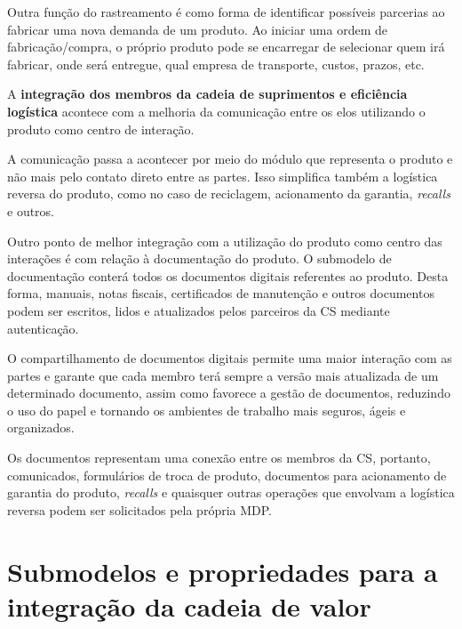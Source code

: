 Outra função do rastreamento é como forma de identificar possíveis parcerias ao fabricar uma nova demanda de um produto. Ao iniciar uma ordem de fabricação/compra, o próprio produto pode se encarregar de selecionar quem irá fabricar, onde será entregue, qual empresa de transporte, custos, prazos, etc.

A  \textbf{integração dos membros da cadeia de suprimentos e eficiência logística} acontece com a melhoria da comunicação entre os elos utilizando o produto como centro de interação.

A comunicação passa a acontecer por meio do módulo que representa o produto e não mais pelo contato direto entre as partes. Isso simplifica também a logística reversa do produto, como no caso de reciclagem, acionamento da garantia, \textit{recalls} e outros.

Outro ponto de melhor integração com a utilização do produto como centro das interações é com relação à documentação do produto. O submodelo de documentação conterá todos os documentos digitais referentes ao produto. Desta forma, manuais, notas fiscais, certificados de manutenção e outros documentos podem ser escritos, lidos e atualizados pelos parceiros da CS mediante autenticação.

O compartilhamento de documentos digitais permite uma maior interação com as partes e garante que cada membro terá sempre a versão mais atualizada de um determinado documento, assim como favorece a gestão de documentos, reduzindo o uso do papel e tornando os ambientes de trabalho mais seguros, ágeis e organizados.

Os documentos representam uma conexão entre os membros da CS, portanto, comunicados, formulários de troca de produto, documentos para acionamento de garantia do produto, \textit{recalls} e quaisquer outras operações que envolvam a logística reversa podem ser solicitados pela própria MDP.

\section{Submodelos e propriedades para a integração da cadeia de valor}

